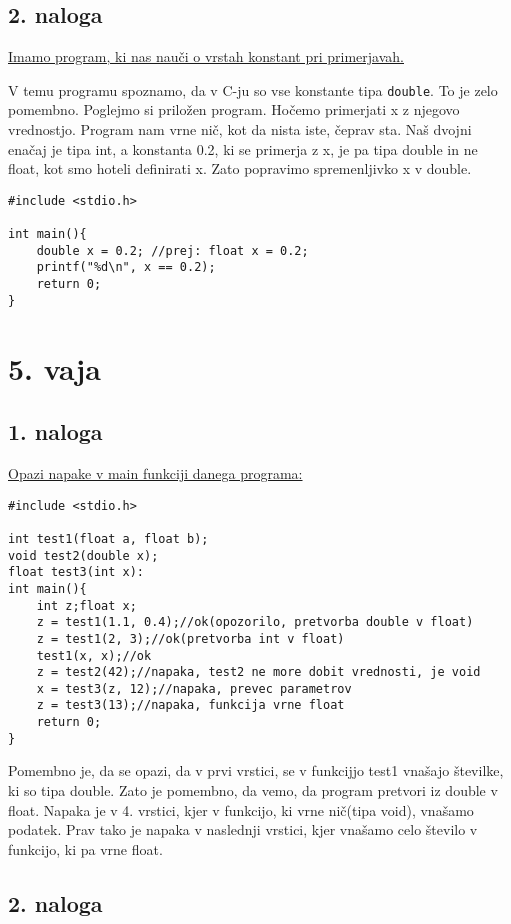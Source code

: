 \documentclass[a4paper, 12pt]{article}
\begin{document}
\subsection*{2. naloga}
\underline{Imamo program, ki nas nauči o vrstah konstant pri primerjavah.}\

V temu programu spoznamo, da v C-ju so vse konstante tipa \lstinline|double|. To je zelo pomembno. Poglejmo si priložen program. Hočemo primerjati x z njegovo vrednostjo. Program nam vrne nič, kot da nista iste, čeprav sta. Naš dvojni enačaj je tipa int, a konstanta 0.2, ki se primerja z x, je pa tipa double in ne float, kot smo hoteli definirati x. Zato popravimo spremenljivko x v double.	
	
\begin{lstlisting}
#include <stdio.h>

int main(){
	double x = 0.2; //prej: float x = 0.2;
	printf("%d\n", x == 0.2);
	return 0;
}
\end{lstlisting}

\section*{5. vaja}
\subsection*{1. naloga}

\underline{Opazi napake v main funkciji danega programa:}
\begin{lstlisting}
#include <stdio.h>

int test1(float a, float b);
void test2(double x);
float test3(int x):
int main(){
	int z;float x;
	z = test1(1.1, 0.4);//ok(opozorilo, pretvorba double v float)
	z = test1(2, 3);//ok(pretvorba int v float)
	test1(x, x);//ok
	z = test2(42);//napaka, test2 ne more dobit vrednosti, je void
	x = test3(z, 12);//napaka, prevec parametrov
	z = test3(13);//napaka, funkcija vrne float
	return 0;
}
\end{lstlisting}
Pomembno je, da se opazi, da v prvi vrstici, se v funkcijjo test1 vnašajo številke, ki so tipa double. Zato je pomembno, da vemo, da program pretvori iz double v float. Napaka je v 4. vrstici, kjer v funkcijo, ki vrne nič(tipa void), vnašamo podatek. Prav tako je napaka v naslednji vrstici, kjer vnašamo celo število v funkcijo, ki pa vrne float.

\subsection*{2. naloga}
\end{document}
